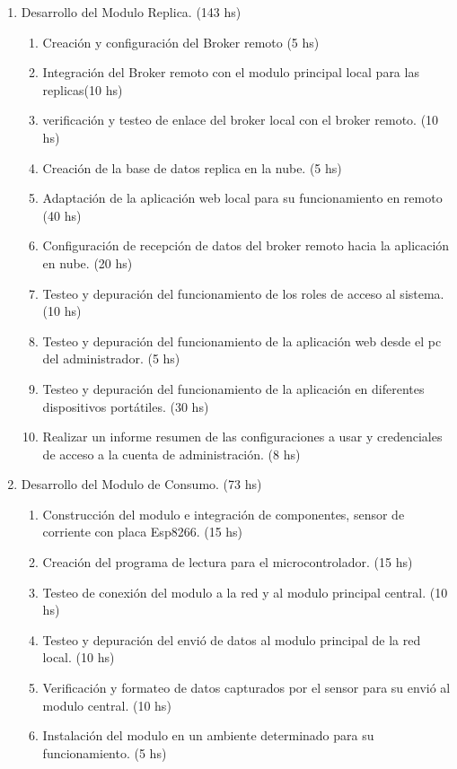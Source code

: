 \documentclass[11pt]{charter}
\begin{document}
\begin{enumerate}
\begin{enumerate}
	\end{enumerate}
\item Desarrollo del Modulo Replica. (143 hs)
	\begin{enumerate}
	\item Creación y configuración del Broker remoto (5 hs)
	\item Integración del Broker remoto con el modulo principal local para las replicas(10 hs)
	\item verificación y testeo de enlace del broker local con el broker remoto. (10 hs)
	\item Creación de la base de datos replica en la nube. (5 hs) 
	\item Adaptación de la aplicación web local para su funcionamiento en remoto  (40 hs)
	\item Configuración de recepción de datos del broker remoto hacia la aplicación en nube.  (20 hs)
	\item Testeo y depuración del funcionamiento de los roles de acceso al sistema. (10 hs) 
	\item Testeo y depuración del funcionamiento de la aplicación web desde el pc del administrador. (5 hs) 
	\item Testeo y depuración del funcionamiento de la aplicación en diferentes dispositivos portátiles. (30 hs)
	\item Realizar un informe resumen de las configuraciones a usar y credenciales de acceso a la cuenta de administración. (8 hs)
	\end{enumerate}
\item Desarrollo del Modulo de Consumo. (73 hs)
	\begin{enumerate}
	\item Construcción del modulo e integración de componentes, sensor de corriente con placa Esp8266. (15 hs)
	\item Creación del programa de lectura para el microcontrolador. (15 hs)
	\item Testeo de conexión del modulo a la red y al modulo principal central. (10 hs)
	\item Testeo y depuración del envió de datos al modulo principal de la red local. (10 hs)
	\item Verificación y formateo de datos capturados por el sensor para su envió al modulo central. (10 hs)
	\item Instalación del modulo en un ambiente determinado para su funcionamiento. (5 hs)

\end{enumerate}
\end{enumerate}
\end{document}
